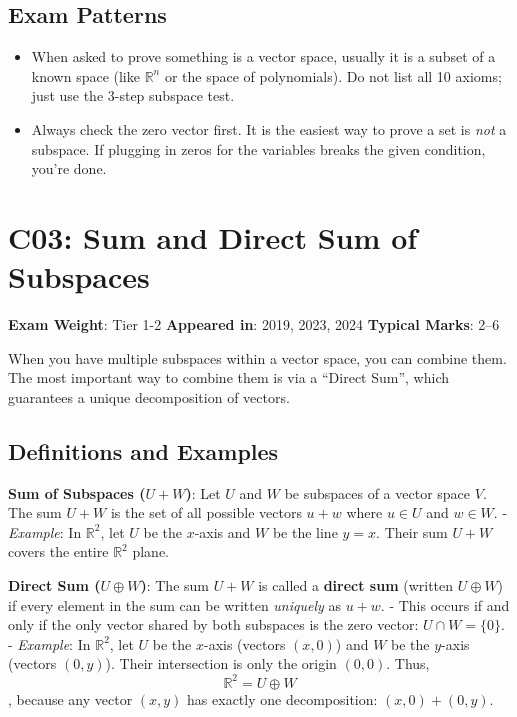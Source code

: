\documentclass[
]{article}
\providecommand{\tightlist}{%
  \setlength{\itemsep}{0pt}\setlength{\parskip}{0pt}}
\renewenvironment{quote}
  {\begin{tcolorbox}[
     colback=calloutbg,
     colframe=calloutframe,
     colupper=callouttext,
     arc=3pt,
     boxrule=0.5pt,
     leftrule=0.5pt,
     borderline west={3pt}{0pt}{calloutaccent},
     left=8pt,
     right=8pt,
     top=6pt,
     bottom=6pt
   ]}
  {\end{tcolorbox}}
\begin{document}
\subsection{Exam Patterns}\label{exam-patterns-30}

\begin{itemize}
\tightlist
\item
  When asked to prove something is a vector space, usually it is a
  subset of a known space (like \(\mathbb{R}^n\) or the space of
  polynomials). Do not list all 10 axioms; just use the 3-step subspace
  test.
\item
  Always check the zero vector first. It is the easiest way to prove a
  set is \emph{not} a subspace. If plugging in zeros for the variables
  breaks the given condition, you're done.
\end{itemize}

\section{C03: Sum and Direct Sum of
Subspaces}\label{c03-sum-and-direct-sum-of-subspaces}

\begin{quote}
\textbf{Exam Weight}: Tier 1-2 \textbar{} \textbf{Appeared in}: 2019,
2023, 2024 \textbar{} \textbf{Typical Marks}: 2--6
\end{quote}

When you have multiple subspaces within a vector space, you can combine
them. The most important way to combine them is via a ``Direct Sum'',
which guarantees a unique decomposition of vectors.

\subsection{Definitions and Examples}\label{definitions-and-examples}

\textbf{Sum of Subspaces (\(U + W\))}: Let \(U\) and \(W\) be subspaces
of a vector space \(V\). The sum \(U + W\) is the set of all possible
vectors \(u + w\) where \(u \in U\) and \(w \in W\). - \emph{Example}:
In \(\mathbb{R}^2\), let \(U\) be the \(x\)-axis and \(W\) be the line
\(y=x\). Their sum \(U+W\) covers the entire \(\mathbb{R}^2\) plane.

\textbf{Direct Sum (\(U \oplus W\))}: The sum \(U + W\) is called a
\textbf{direct sum} (written \(U \oplus W\)) if every element in the sum
can be written \emph{uniquely} as \(u + w\). - This occurs if and only
if the only vector shared by both subspaces is the zero vector:
\(U \cap W = \lbrace 0\rbrace\). - \emph{Example}: In \(\mathbb{R}^2\),
let \(U\) be the \(x\)-axis (vectors \((x,0)\)) and \(W\) be the
\(y\)-axis (vectors \((0,y)\)). Their intersection is only the origin
\((0,0)\). Thus,
\[
\mathbb{R}^2 = U \oplus W
\]
, because any vector \((x,y)\) has exactly one decomposition:
\((x,0) + (0,y)\).
\end{document}
